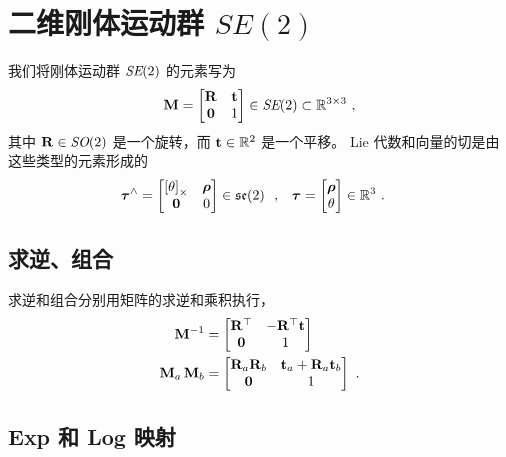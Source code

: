 

\section{二维刚体运动群 $SE(2)$}
\label{sec:SE2}


我们将刚体运动群 $\textit{SE}(2)$ 的元素写为
%
\begin{align}
{\bf M}= \begin{bmatrix}
{\bf R} & {\bf t} \\ \bf0 & 1
\end{bmatrix} \in \textit{SE}(2) \subset {\mathbb R}^{3\times3}
~,
\end{align}
%
其中 ${\bf R}\in\textit{SO}(2)$ 是一个旋转，而 ${\bf t}\in{\mathbb R}^2$ 是一个平移。
Lie 代数和向量的切是由这些类型的元素形成的
%
\begin{align} 
{\bm \tau}^\wedge
  &= \begin{bmatrix}\left[\theta\right]_\times & {\bm \rho} \\ \bf0 & 0\end{bmatrix} \in {\mathfrak {se}}(2)
  ~~,
& 
{\bm \tau}
  &= \begin{bmatrix}{\bm \rho} \\ \theta\end{bmatrix}\in{\mathbb R}^3 
~.
\end{align}
%

\subsection{求逆、组合}

求逆和组合分别用矩阵的求逆和乘积执行，
%
\begin{align}
{\bf M}^{-1} &= \begin{bmatrix}
{\bf R}^{\top} & -{\bf R}^{\top}{\bf t} \\ \bf0 & 1
\end{bmatrix} 
\\
{\bf M}_a\,{\bf M}_b &= \begin{bmatrix}
{\bf R}_a{\bf R}_b & {\bf t}_a+{\bf R}_a{\bf t}_b \\ \bf0 & 1
\end{bmatrix} 
~.
\end{align}

\subsection{Exp 和 Log 映射}

